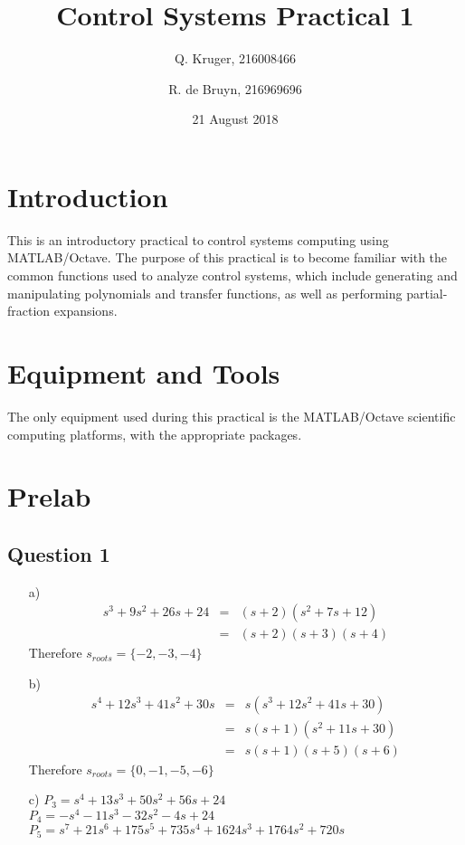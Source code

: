 \documentclass[12pt, a4paper]{article}
\title{Control Systems Practical 1}
\date{21 August 2018}
\author{Q. Kruger, 216008466 \and R. de Bruyn, 216969696}
\begin{document}
	\maketitle
	\newpage
	\tableofcontents
	\newpage
	
	\section{Introduction} %
	\label{sec:introduction}
		This is an introductory practical to control systems computing using MATLAB/Octave. The purpose of this practical is to become familiar with the common functions used to analyze control systems, which include generating and manipulating polynomials and transfer functions, as well as performing partial-fraction expansions.

	\section{Equipment and Tools} %
	\label{sec:equipment_and_tools}
		The only equipment used during this practical is the MATLAB/Octave scientific computing platforms, with the appropriate packages.

	\section{Prelab} %
	\label{sec:prelab}
		\subsection*{Question 1} %
		\label{sub:question_1}
			\begin{itemize}
				\item[a)]
					\[
						\begin{array}{rcl}
							s^3 + 9s^2 + 26s + 24 & = & (s+2)(s^2 + 7s + 12) \\
							& = & (s+2)(s+3)(s+4)
						\end{array}
					\]
					Therefore $s_{roots} = \{-2,-3,-4\}$
				\item[b)]
					\[
						\begin{array}{rcl}
							s^4 + 12s^3 + 41s^2 + 30s & = & s(s^3 + 12s^2 + 41s +30) \\
							& = & s(s+1)(s^2 + 11s + 30) \\
							& = & s(s+1)(s+5)(s+6)
						\end{array}
					\]
					Therefore $s_{roots} = \{0,-1,-5,-6\}$
				\item[c)] $P_3 = s^4 + 13s^3 + 50s^2 + 56s + 24$\\
						  $P_4 = -s^4 -11s^3 -32s^2 -4s + 24$ \\
						  $P_5 = s^7 + 21s^6 + 175s^5 +735s^4 + 1624s^3 + 1764s^2 + 720s$
			\end{itemize}
\end{document}
